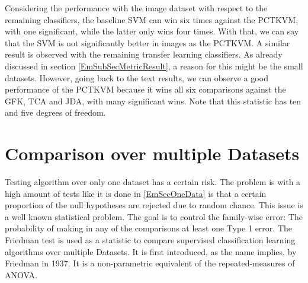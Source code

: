 Considering the performance with the image dataset with respect to the remaining classifiers, the baseline \acs{SVM} can win six times against the \acs{PCTKVM}, with one significant, while the latter only wins four times.
With that, we can say that the \acs{SVM} is not significantly better in images as the \acs{PCTKVM}.
A similar result is observed with the remaining transfer learning classifiers.
As already discussed in section \ref{EmSubSecMetricResult}, a reason for this might be the small datasets.
However, going back to the text results, we can observe a good performance of the \acs{PCTKVM} because it wins all six comparisons against the \acs{GFK}, \acs{TCA} and \acs{JDA}, with many significant wins.
Note that this statistic has ten and five degrees of freedom.
\begin{table}[]
	\centering
	\caption[Result of the 5 x 2 cv F Test]{The result of the 5 x 2 cv F test to compare classifiers on one dataset under the Error metrics. The competitor is PCTKVM and the result is shown as the number of wins, losses and ties.\label{TableFiveTwo}}
\end{table}
\FloatBarrier
\section{Comparison over multiple Datasets}\label{EmSecMulDa}
Testing algorithm over only one dataset has a certain risk. The problem is with a high amount of tests like it is done in \ref{EmSecOneData} is that a certain proportion of the null hypotheses are rejected due to random chance. This issue is a well known statistical problem. The goal is to control the family-wise error: The probability of making in any of the comparisons at least one Type 1 error.
The Friedman test is used as a statistic to compare supervised classification learning algorithms over multiple Datasets.
It is first introduced, as the name implies, by Friedman in 1937. It is a non-parametric equivalent of the repeated-measures of \ac{ANOVA}.\cite[p. 9-10]{JanezDemsar.2006}\\ 
